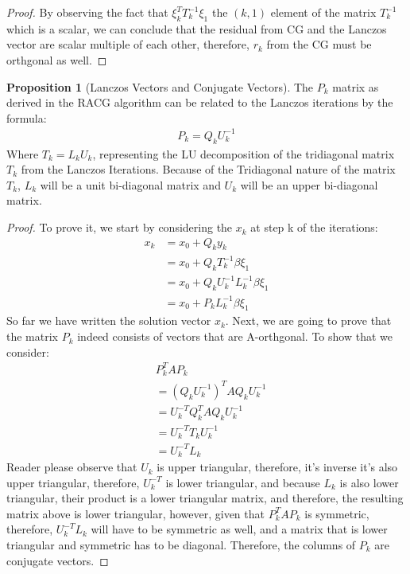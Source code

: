 \documentclass[]{article}
\theoremstyle{definition}
\newtheorem{prop}{Proposition}[section]  %
\begin{document}
\begin{proof}
                By observing the fact that $\xi^T_kT^{-1}_k\xi_1$ the $(k, 1)$ element of the matrix $T_k^{-1}$ which is a scalar, we can conclude that the residual from CG and the Lanczos vector are scalar multiple of each other, therefore, $r_k$ from the CG must be orthgonal as well. 
            \end{proof}
            \begin{prop}[Lanczos Vectors and Conjugate Vectors]
                The $P_k$ matrix as derived in the RACG algorithm can be related to the Lanczos iterations by the formula: 
                \begin{align}
                    P_k = Q_k U_k^{-1}
                \end{align}
                Where $T_k = L_kU_k$, representing the LU decomposition of the tridiagonal matrix $T_k$ from the Lanczos Iterations. Because of the Tridiagonal nature of the matrix $T_k$, $L_k$ will be a unit bi-diagonal matrix and $U_k$ will be an upper bi-diagonal matrix. 
            \end{prop}
            \begin{proof}
                To prove it, we start by considering the $x_k$ at step k of the iterations: 
                \begin{align}
                    x_k &= x_0 + Q_k y_k 
                    \\
                    &= x_0 + Q_k T_{k}^{-1} \beta \xi_1
                    \\
                    &= x_0 + Q_k U_k^{-1}L_k^{-1}\beta \xi_1
                    \\
                    &= x_0 + P_k L_k^{-1}\beta\xi_1
                \end{align}
                So far we have written the solution vector $x_k$. Next, we are going to prove that the matrix $P_k$ indeed consists of vectors that are A-orthgonal. To show that we consider: 
                \begin{align}
                    & P_k^TAP_k
                    \\
                    &= (Q_k U_k^{-1})^T AQ_kU_k^{-1}
                    \\
                    &= U_k^{-T}Q_k^{T}AQ_k U_k^{-1}
                    \\
                    &= U_k^{-T}T_kU_k^{-1}
                    \\
                    &= U^{-T}_kL_k
                \end{align}
                Reader please observe that $U_k$ is upper triangular, therefore, it's inverse it's also upper triangular, therefore, $U_k^{-T}$ is lower triangular, and because $L_k$ is also lower triangular, their product is a lower triangular matrix, and therefore, the resulting matrix above is lower triangular, however, given that $P_k^TAP_k$ is symmetric, therefore, $U_k^{-T}L_k$ will have to be symmetric as well, and a matrix that is lower triangular and symmetric has to be diagonal. Therefore, the columns of $P_k$ are conjugate vectors. 
            \end{proof}
\end{document}
